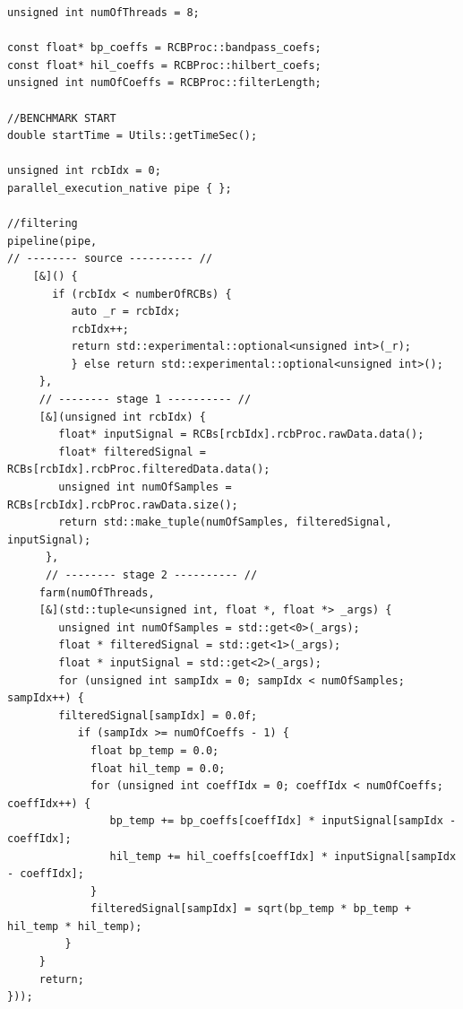 \begin{small}
\begin{lstlisting}[label=code:filtering_generated,caption={eRDM refactored using ParaFormance}]
unsigned int numOfThreads = 8;

const float* bp_coeffs = RCBProc::bandpass_coefs;
const float* hil_coeffs = RCBProc::hilbert_coefs;
unsigned int numOfCoeffs = RCBProc::filterLength;

//BENCHMARK START
double startTime = Utils::getTimeSec();

unsigned int rcbIdx = 0;
parallel_execution_native pipe { };

//filtering
pipeline(pipe,
// -------- source ---------- //
    [&]() {
       if (rcbIdx < numberOfRCBs) {
          auto _r = rcbIdx;
          rcbIdx++;
          return std::experimental::optional<unsigned int>(_r);
          } else return std::experimental::optional<unsigned int>();
     },
     // -------- stage 1 ---------- //
     [&](unsigned int rcbIdx) {
        float* inputSignal = RCBs[rcbIdx].rcbProc.rawData.data();
        float* filteredSignal = RCBs[rcbIdx].rcbProc.filteredData.data();
        unsigned int numOfSamples = RCBs[rcbIdx].rcbProc.rawData.size();
        return std::make_tuple(numOfSamples, filteredSignal, inputSignal);
      },
      // -------- stage 2 ---------- //
     farm(numOfThreads,
     [&](std::tuple<unsigned int, float *, float *> _args) {
        unsigned int numOfSamples = std::get<0>(_args);
        float * filteredSignal = std::get<1>(_args);
        float * inputSignal = std::get<2>(_args);
        for (unsigned int sampIdx = 0; sampIdx < numOfSamples; sampIdx++) {
        filteredSignal[sampIdx] = 0.0f;
           if (sampIdx >= numOfCoeffs - 1) {
             float bp_temp = 0.0;
             float hil_temp = 0.0;
             for (unsigned int coeffIdx = 0; coeffIdx < numOfCoeffs; coeffIdx++) {
                bp_temp += bp_coeffs[coeffIdx] * inputSignal[sampIdx - coeffIdx];
                hil_temp += hil_coeffs[coeffIdx] * inputSignal[sampIdx - coeffIdx];
             }
             filteredSignal[sampIdx] = sqrt(bp_temp * bp_temp + hil_temp * hil_temp);
         }
     }
     return;
}));

\end{lstlisting}
\end{small}

